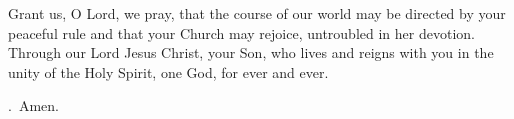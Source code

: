 \lettrine[lines=3]{G}{}rant us, O Lord, we pray,
that the course of our world
may be directed by your peaceful rule
and that your Church may rejoice,
untroubled in her devotion.
Through our Lord Jesus Christ, your Son,
who lives and reigns with you in the unity of the Holy Spirit,
one God, for ever and ever. \par \Rbar.~Amen.
